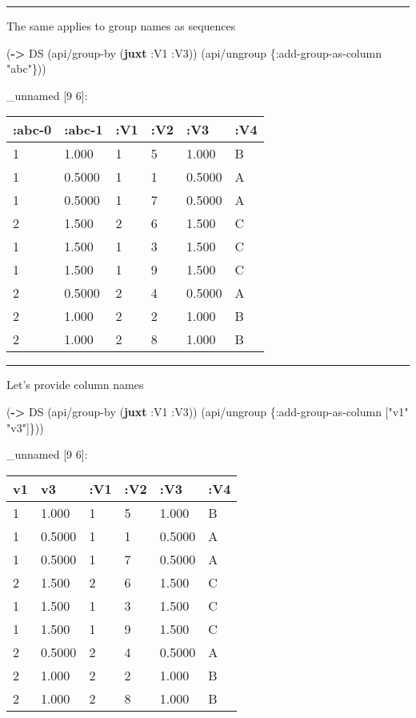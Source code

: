 \documentclass[]{article}
\newenvironment{Shaded}{\begin{snugshade}}{\end{snugshade}}
\newcommand{\KeywordTok}[1]{\textcolor[rgb]{0.13,0.29,0.53}{\textbf{#1}}}
\newcommand{\StringTok}[1]{\textcolor[rgb]{0.31,0.60,0.02}{#1}}
\newcommand{\AttributeTok}[1]{\textcolor[rgb]{0.77,0.63,0.00}{#1}}
\newcommand{\NormalTok}[1]{#1}
\begin{document}
\begin{center}\rule{0.5\linewidth}{0.5pt}\end{center}

The same applies to group names as sequences

\begin{Shaded}
\begin{Highlighting}[]
\NormalTok{(}\KeywordTok{->}\NormalTok{ DS}
\NormalTok{    (api/group-by (}\KeywordTok{juxt} \AttributeTok{:V1} \AttributeTok{:V3}\NormalTok{))}
\NormalTok{    (api/ungroup \{}\AttributeTok{:add-group-as-column} \StringTok{"abc"}\NormalTok{\}))}
\end{Highlighting}
\end{Shaded}

\_unnamed {[}9 6{]}:

\begin{longtable}[]{@{}llllll@{}}
\toprule
:abc-0 & :abc-1 & :V1 & :V2 & :V3 & :V4\tabularnewline
\midrule
\endhead
1 & 1.000 & 1 & 5 & 1.000 & B\tabularnewline
1 & 0.5000 & 1 & 1 & 0.5000 & A\tabularnewline
1 & 0.5000 & 1 & 7 & 0.5000 & A\tabularnewline
2 & 1.500 & 2 & 6 & 1.500 & C\tabularnewline
1 & 1.500 & 1 & 3 & 1.500 & C\tabularnewline
1 & 1.500 & 1 & 9 & 1.500 & C\tabularnewline
2 & 0.5000 & 2 & 4 & 0.5000 & A\tabularnewline
2 & 1.000 & 2 & 2 & 1.000 & B\tabularnewline
2 & 1.000 & 2 & 8 & 1.000 & B\tabularnewline
\bottomrule
\end{longtable}

\begin{center}\rule{0.5\linewidth}{0.5pt}\end{center}

Let's provide column names

\begin{Shaded}
\begin{Highlighting}[]
\NormalTok{(}\KeywordTok{->}\NormalTok{ DS}
\NormalTok{    (api/group-by (}\KeywordTok{juxt} \AttributeTok{:V1} \AttributeTok{:V3}\NormalTok{))}
\NormalTok{    (api/ungroup \{}\AttributeTok{:add-group-as-column}\NormalTok{ [}\StringTok{"v1"} \StringTok{"v3"}\NormalTok{]\}))}
\end{Highlighting}
\end{Shaded}

\_unnamed {[}9 6{]}:

\begin{longtable}[]{@{}llllll@{}}
\toprule
v1 & v3 & :V1 & :V2 & :V3 & :V4\tabularnewline
\midrule
\endhead
1 & 1.000 & 1 & 5 & 1.000 & B\tabularnewline
1 & 0.5000 & 1 & 1 & 0.5000 & A\tabularnewline
1 & 0.5000 & 1 & 7 & 0.5000 & A\tabularnewline
2 & 1.500 & 2 & 6 & 1.500 & C\tabularnewline
1 & 1.500 & 1 & 3 & 1.500 & C\tabularnewline
1 & 1.500 & 1 & 9 & 1.500 & C\tabularnewline
2 & 0.5000 & 2 & 4 & 0.5000 & A\tabularnewline
2 & 1.000 & 2 & 2 & 1.000 & B\tabularnewline
2 & 1.000 & 2 & 8 & 1.000 & B\tabularnewline
\bottomrule
\end{longtable}
\end{document}
